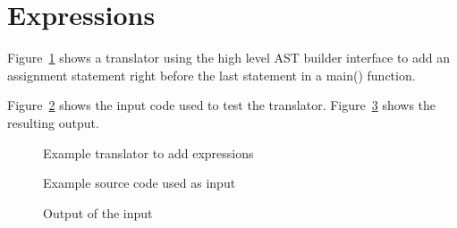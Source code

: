 \clearpage
\section{Expressions}
Figure~\ref{Tutorial:exampleAddExpression} shows a translator
using the high level AST builder interface to add an assignment statement right
before the last statement in a main() function.  

   Figure~\ref{Tutorial:exampleInputCode_AddExpression} shows the
input code used to test the translator.
Figure~\ref{Tutorial:exampleOutput_AddExpression} shows the resulting output.

\begin{figure}[!ht]
{\indent
{\mySmallFontSize
\begin{latexonly}
   
\end{latexonly}
\begin{htmlonly}
   
\end{htmlonly}
}
}
\caption{Example translator to add expressions}
\label{Tutorial:exampleAddExpression}
\end{figure}

\begin{figure}[!ht]
{\indent
{\mySmallFontSize
\begin{latexonly}
   
\end{latexonly}
\begin{htmlonly}
   
\end{htmlonly}
}
}
\caption{Example source code used as input}
\label{Tutorial:exampleInputCode_AddExpression}
\end{figure}

\begin{figure}[!ht]
{\indent
{\mySmallFontSize
\begin{latexonly}
   
\end{latexonly}
\begin{htmlonly}
   
\end{htmlonly}

}
}
\caption{Output of the input}
\label{Tutorial:exampleOutput_AddExpression}
\end{figure}

